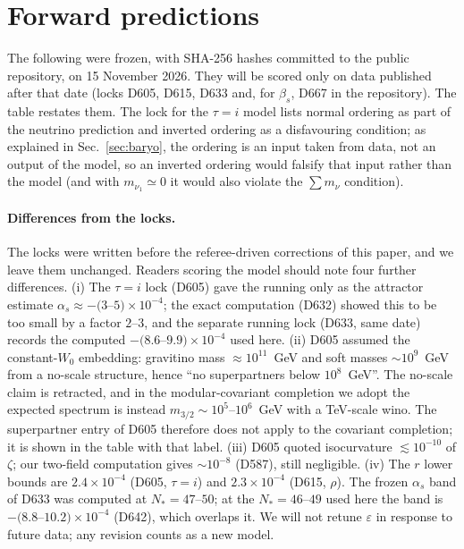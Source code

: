 \documentclass[aps,prd,twocolumn,superscriptaddress,nofootinbib,floatfix]{revtex4-2}
\begin{document}
\section{Forward predictions}\label{sec:forward}
The following were frozen, with SHA-256 hashes committed to the public repository, on 15 November 2026. They will be scored only on data published after that date (locks D605, D615, D633 and, for $\beta_s$, D667 in the repository). The table restates them. The lock for the $\tau=i$ model lists normal ordering as part of the neutrino prediction and inverted ordering as a disfavouring condition; as explained in Sec.~\ref{sec:baryo}, the ordering is an input taken from data, not an output of the model, so an inverted ordering would falsify that input rather than the model (and with $m_{\nu_1}\simeq0$ it would also violate the $\sum m_\nu$ condition).

\paragraph{Differences from the locks.} The locks were written before the referee-driven corrections of this paper, and we leave them unchanged. Readers scoring the model should note four further differences. (i) The $\tau=i$ lock (D605) gave the running only as the attractor estimate $\alpha_s\approx-(3$--$5)\times10^{-4}$; the exact computation (D632) showed this to be too small by a factor $2$--$3$, and the separate running lock (D633, same date) records the computed $-(8.6$--$9.9)\times10^{-4}$ used here. (ii) D605 assumed the constant-$W_0$ embedding: gravitino mass $\approx10^{11}$~GeV and soft masses $\sim10^9$~GeV from a no-scale structure, hence ``no superpartners below $10^8$~GeV''. The no-scale claim is retracted, and in the modular-covariant completion we adopt the expected spectrum is instead $m_{3/2}\sim10^5$--$10^6$~GeV with a TeV-scale wino. The superpartner entry of D605 therefore does not apply to the covariant completion; it is shown in the table with that label. (iii) D605 quoted isocurvature $\lesssim10^{-10}$ of $\zeta$; our two-field computation gives $\sim10^{-8}$ (D587), still negligible. (iv) The $r$ lower bounds are $2.4\times10^{-4}$ (D605, $\tau=i$) and $2.3\times10^{-4}$ (D615, $\rho$). The frozen $\alpha_s$ band of D633 was computed at $N_*=47$--$50$; at the $N_*=46$--$49$ used here the band is $-(8.8$--$10.2)\times10^{-4}$ (D642), which overlaps it. We will not retune $\varepsilon$ in response to future data; any revision counts as a new model.
\end{document}
